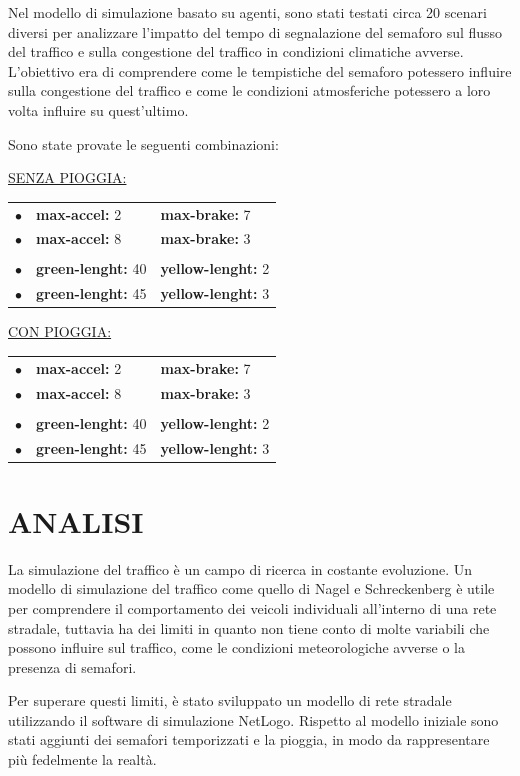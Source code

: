 \documentclass[11pt]{article}
\begin{document}
Nel modello di simulazione basato su agenti, sono stati testati circa 20 scenari diversi per analizzare l'impatto del tempo di segnalazione del semaforo sul flusso del traffico e sulla congestione del traffico in condizioni climatiche avverse. L'obiettivo era di comprendere come le tempistiche del semaforo potessero influire sulla congestione del traffico e come le condizioni atmosferiche potessero a loro volta influire su quest'ultimo.

Sono state provate le seguenti combinazioni:

\underline{SENZA PIOGGIA:}

\begin{tabular}{c l l}
$\bullet$ & \textbf{max-accel:} 2 & \textbf{max-brake:} 7\\
$\bullet$ & \textbf{max-accel:} 8 & \textbf{max-brake:} 3\\
&& \\
$\bullet$ & \textbf{green-lenght:} 40 & \textbf{yellow-lenght:} 2\\
$\bullet$ & \textbf{green-lenght:} 45 & \textbf{yellow-lenght:} 3
\end{tabular}


\underline{CON PIOGGIA:}

\begin{tabular}{c l l}
$\bullet$ & \textbf{max-accel:} 2 & \textbf{max-brake:} 7\\
$\bullet$ & \textbf{max-accel:} 8 & \textbf{max-brake:} 3\\
&& \\
$\bullet$ & \textbf{green-lenght:} 40 & \textbf{yellow-lenght:} 2\\
$\bullet$ & \textbf{green-lenght:} 45 & \textbf{yellow-lenght:} 3
\end{tabular}

\section{ANALISI}
La simulazione del traffico è un campo di ricerca in costante evoluzione. Un modello di simulazione del traffico come quello di Nagel e Schreckenberg è utile per comprendere il comportamento dei veicoli individuali all'interno di una rete stradale, tuttavia ha dei limiti in quanto non tiene conto di molte variabili che possono influire sul traffico, come le condizioni meteorologiche avverse o la presenza di semafori.

Per superare questi limiti, è stato sviluppato un modello di rete stradale utilizzando il software di simulazione NetLogo. Rispetto al modello iniziale sono stati aggiunti dei semafori temporizzati e la pioggia, in modo da rappresentare più fedelmente la realtà.
\end{document}
